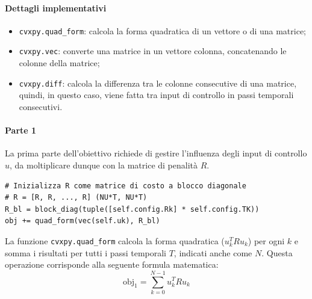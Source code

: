 \paragraph{Dettagli implementativi}
\begin{itemize}
    \item \verb|cvxpy.quad_form|: calcola la forma quadratica di un vettore o di una matrice;
    \item \verb|cvxpy.vec|: converte una matrice in un vettore colonna, concatenando le colonne della matrice;
    \item \verb|cvxpy.diff|: calcola la differenza tra le colonne consecutive di una matrice, 
    quindi, in questo caso, viene fatta tra input di controllo in passi temporali consecutivi.
\end{itemize}
\paragraph{Parte 1} La prima parte dell'obiettivo richiede di gestire 
l'influenza degli input di controllo $u$, da moltiplicare dunque con la matrice di penalità $R$.
\begin{lstlisting}[language=PythonPlus]
# Inizializza R come matrice di costo a blocco diagonale
# R = [R, R, ..., R] (NU*T, NU*T)
R_bl = block_diag(tuple([self.config.Rk] * self.config.TK))
obj += quad_form(vec(self.uk), R_bl)
\end{lstlisting}
La funzione \verb|cvxpy.quad_form| calcola la forma quadratica ($u_k^T R u_k$) per ogni $k$ e somma i risultati per tutti i passi temporali $T$, indicati anche come $N$.
Questa operazione corrisponde alla seguente formula matematica: 
\[
\text{obj}_1 = \sum_{k=0}^{N-1}{u_k^T R u_k}
\]
